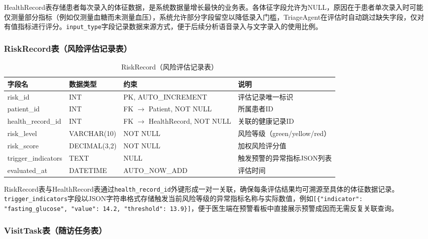 HealthRecord表存储患者每次录入的体征数据，是系统数据量增长最快的业务表。各体征字段允许为NULL，原因在于患者单次录入时可能仅测量部分指标（例如仅测量血糖而未测量血压），系统允许部分字段留空以降低录入门槛，TriageAgent在评估时自动跳过缺失字段，仅对有值指标进行评分。\texttt{input\_type}字段记录数据来源方式，便于后续分析语音录入与文字录入的使用比例。


\subsubsection{RiskRecord表（风险评估记录表）}

\begin{table}[H]
\centering
\caption{RiskRecord（风险评估记录表）}
\label{tab:table-riskrecord}
\begin{tabularx}{\textwidth}{|l|l|l|X|}
\hline
\textbf{字段名} & \textbf{数据类型} & \textbf{约束} & \textbf{说明} \\
\hline
risk\_id & INT & PK, AUTO\_INCREMENT & 评估记录唯一标识 \\
\hline
patient\_id & INT & FK $\rightarrow$ Patient, NOT NULL & 所属患者ID \\
\hline
health\_record\_id & INT & FK $\rightarrow$ HealthRecord, NOT NULL & 关联的健康记录ID \\
\hline
risk\_level & VARCHAR(10) & NOT NULL & 风险等级（green/yellow/red） \\
\hline
risk\_score & DECIMAL(3,2) & NOT NULL & 加权风险评分值 \\
\hline
trigger\_indicators & TEXT & NULL & 触发预警的异常指标JSON列表 \\
\hline
evaluated\_at & DATETIME & AUTO\_NOW\_ADD & 评估时间 \\
\hline
\end{tabularx}
\end{table}

RiskRecord表与HealthRecord表通过\texttt{health\_record\_id}外键形成一对一关联，确保每条评估结果均可溯源至具体的体征数据记录。\texttt{trigger\_indicators}字段以JSON字符串格式存储触发当前风险等级的异常指标名称与实际数值，例如\texttt{[\{"indicator": "fasting\_glucose", "value": 14.2, "threshold": 13.9\}]}，便于医生端在预警看板中直接展示预警成因而无需反复关联查询。


\subsubsection{VisitTask表（随访任务表）}

